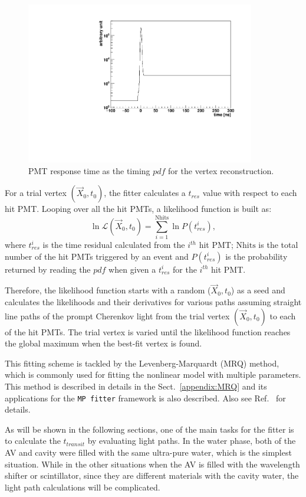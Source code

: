 \begin{figure}[!htb]
	\centering
	\includegraphics[width=10cm]{MPW_timingPDF.pdf}
	\caption{PMT response time as the timing $pdf$ for the vertex reconstruction.}
	\label{fig:MPW_timingPDF}
\end{figure}

For a trial vertex $(\vec{X}_0,t_0)$, the fitter calculates a $t_{res}$ value with respect to each hit PMT. Looping over all the hit PMTs, a likelihood function is built as:
\begin{equation}\label{eq:vertexLogL}
\ln\mathcal{L}(\vec{X}_0,t_0)=\sum_{i=1}^{{\mathrm{Nhits}}}\ln P(t^i_{res}),
\end{equation}
where $t^i_{res}$ is the time residual calculated from the $i^{th}$ hit PMT; $\mathrm{Nhits}$ is the total number of the hit PMTs triggered by an event and $P(t^i_{res})$ is the probability returned by reading the $pdf$ when given a $t^i_{res}$ for the $i^{th}$ hit PMT.

Therefore, the likelihood function starts with a random ($\vec{X}_0,t_0$) as a seed and calculates the likelihoods and their derivatives for various paths assuming straight line paths of the prompt Cherenkov light from the trial vertex $(\vec{X}_0,t_0)$ to each of the hit PMTs. The trial vertex is varied until the likelihood function reaches the global maximum when the best-fit vertex is found.

This fitting scheme is tackled by the Levenberg-Marquardt (MRQ) method, which is commonly used for fitting the nonlinear model with multiple parameters. This method is described in details in the Sect.~\ref{appendix:MRQ} and its applications for the \texttt{MP fitter} framework is also described. Also see Ref.~\cite{gregory2005bayesian, press2007numerical} for details.

As will be shown in the following sections, one of the main tasks for the fitter is to calculate the $t_{transit}$ by evaluating light paths. In the water phase, both of the AV and cavity were filled with the same ultra-pure water, which is the simplest situation. While in the other situations when the AV is filled with the wavelength shifter or scintillator, since they are different materials with the cavity water, the light path calculations will be complicated.

